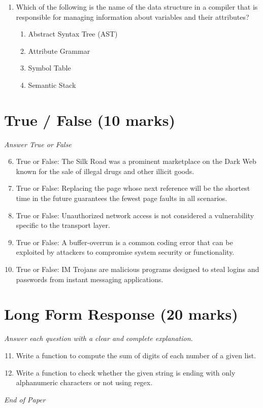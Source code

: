 \documentclass[12pt]{article}
\begin{document}
\begin{enumerate}[label=\arabic*.]
\begin{enumerate}[label=(\alph*)]
    \item Transceiver Station
\end{enumerate}
\item Which of the following is the name of the data structure in a compiler that is responsible for managing information about variables and their attributes?
\begin{enumerate}[label=(\alph*)]
    \item Abstract Syntax Tree (AST)
    \item Attribute Grammar
    \item Symbol Table
    \item Semantic Stack
\end{enumerate}
\end{enumerate}

\section*{True / False (10 marks)}
\textit{Answer True or False}
\begin{enumerate}[label=\arabic*.]
\setcounter{enumi}{5}
\item True or False: The Silk Road was a prominent marketplace on the Dark Web known for the sale of illegal drugs and other illicit goods.
\item True or False: Replacing the page whose next reference will be the shortest time in the future guarantees the fewest page faults in all scenarios.
\item True or False: Unauthorized network access is not considered a vulnerability specific to the transport layer.
\item True or False: A buffer-overrun is a common coding error that can be exploited by attackers to compromise system security or functionality.
\item True or False: IM Trojans are malicious programs designed to steal logins and passwords from instant messaging applications.
\end{enumerate}

\section*{Long Form Response (20 marks)}
\textit{Answer each question with a clear and complete explanation.}
\begin{enumerate}[label=\arabic*.]
\setcounter{enumi}{10}
\item Write a function to compute the sum of digits of each number of a given list.
\item Write a function to check whether the given string is ending with only alphanumeric characters or not using regex.
\end{enumerate}

\vfill
\noindent\textit{End of Paper}
\end{document}
